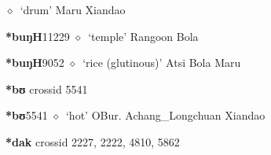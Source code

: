 \begin{list}{}{\leftmargin=1.5em \itemindent=-1.5em}
\hspace{1ex}
         $\diamond$~`drum'
         Maru 
\hspace{1ex}
         Xiandao 
  \item {\footnotesize \textbf{*buŋH}}{\tiny 11229}
\hspace{1ex}
         $\diamond$~`temple'
         Rangoon 
\hspace{1ex}
         Bola 
  \item {\footnotesize \textbf{*buŋH}}{\tiny 9052}
\hspace{1ex}
         $\diamond$~`rice (glutinous)'
         Atsi 
\hspace{1ex}
         Bola 
\hspace{1ex}
         Maru 
  \end{list}
\item
\textbf{*bʊ}
  {\tiny crossid 5541}
  \begin{list}{}{\leftmargin=1.5em \itemindent=-1.5em}
  \item {\footnotesize \textbf{*bʊ}}{\tiny 5541}
         $\diamond$~`hot'
         OBur. 
\hspace{1ex}
         Achang\_Longchuan 
\hspace{1ex}
         Xiandao 
  \end{list}
\item
\textbf{*dak}
  {\tiny crossid 2227, 2222, 4810, 5862}
